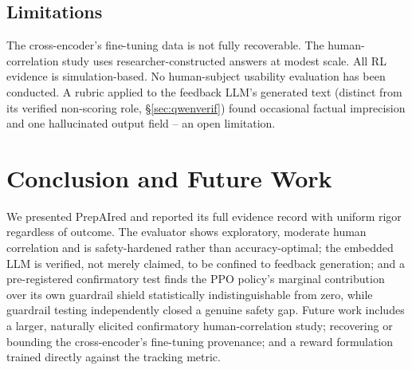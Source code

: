 \documentclass[conference]{IEEEtran}
\begin{document}
\subsection{Limitations}

The cross-encoder's fine-tuning data is not fully recoverable. The human-correlation study uses researcher-constructed answers at modest scale. All RL evidence is simulation-based. No human-subject usability evaluation has been conducted. A rubric applied to the feedback LLM's generated text (distinct from its verified non-scoring role, \S\ref{sec:qwenverif}) found occasional factual imprecision and one hallucinated output field -- an open limitation.

\section{Conclusion and Future Work}

We presented PrepAIred and reported its full evidence record with uniform rigor regardless of outcome. The evaluator shows exploratory, moderate human correlation and is safety-hardened rather than accuracy-optimal; the embedded LLM is verified, not merely claimed, to be confined to feedback generation; and a pre-registered confirmatory test finds the PPO policy's marginal contribution over its own guardrail shield statistically indistinguishable from zero, while guardrail testing independently closed a genuine safety gap. Future work includes a larger, naturally elicited confirmatory human-correlation study; recovering or bounding the cross-encoder's fine-tuning provenance; and a reward formulation trained directly against the tracking metric.
\end{document}
